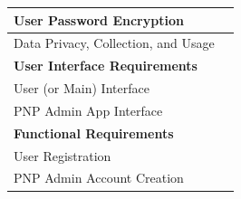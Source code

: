 \begin{table}[!ht]
\begin{tabular}{|ll|}
\multicolumn{1}{|l|}{User Password Encryption}                                                                                                                      &                                                                 {\hspace{1.75cm}}                           \\ \hline
\multicolumn{1}{|l|}{Data Privacy, Collection, and Usage}                                                                                                           &                                                          {\hspace{1.75cm}}                                  \\ \hline
\multicolumn{2}{|l|}{\textbf{User Interface Requirements}}                                                                                                                                                                                                       \\ \hline
\multicolumn{1}{|l|}{User (or Main) Interface}                                                                                                                      &                                                             {\hspace{1.75cm}}                               \\ \hline
\multicolumn{1}{|l|}{PNP Admin App Interface}                                                                                                                       &                                                             {\hspace{1.75cm}}                               \\ \hline
\multicolumn{2}{|l|}{\textbf{Functional Requirements}}                                                                                                                                                                                                           \\ \hline
\multicolumn{1}{|l|}{User Registration}                                                                                                                             &                                                               {\hspace{1.75cm}}                             \\ \hline
\multicolumn{1}{|l|}{PNP Admin Account Creation}                                                                                                                    &                                                               {\hspace{1.75cm}}                             \\ \hline

\end{tabular}
\end{table}
